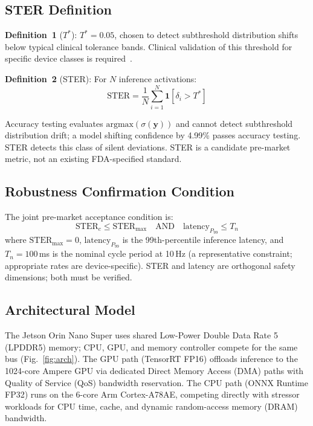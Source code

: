\documentclass[journal,twoside,9pt]{IEEEtran}
\begin{document}
\subsection{STER Definition}

\textbf{Definition~1} ($T^*$): $T^* = 0.05$, chosen to detect subthreshold
distribution shifts below typical clinical tolerance bands. Clinical validation
of this threshold for specific device classes is required~\cite{iso14971}.

\textbf{Definition~2} (STER): For $N$ inference activations:
\begin{equation}
  \text{STER} = \frac{1}{N}\sum_{i=1}^{N} \mathbf{1}[\delta_i > T^*]
  \label{eq:ster}
\end{equation}

Accuracy testing evaluates $\text{argmax}(\sigma(\mathbf{y}))$ and cannot detect
subthreshold distribution drift; a model shifting confidence by 4.99\% passes accuracy
testing. STER detects this class of silent deviations. STER is a candidate pre-market
metric, not an existing FDA-specified standard.

\subsection{Robustness Confirmation Condition}

The joint pre-market acceptance condition is:
\begin{equation}
  \text{STER}_c \leq \text{STER}_{\max}
  \quad\text{AND}\quad
  \text{latency}_{P_{99}} \leq T_n
  \label{eq:joint}
\end{equation}
where $\text{STER}_{\max}=0$, $\text{latency}_{P_{99}}$ is the 99th-percentile
inference latency, and $T_n=100$\,ms is the nominal cycle period at 10\,Hz (a
representative constraint; appropriate rates are device-specific). STER and latency
are orthogonal safety dimensions; both must be verified.

\subsection{Architectural Model}

The Jetson Orin Nano Super uses shared Low-Power Double Data Rate 5 (LPDDR5) memory;
CPU, GPU, and memory controller compete for the same bus (Fig.~\ref{fig:arch}). The
GPU path (TensorRT FP16) offloads inference to the 1024-core Ampere GPU via dedicated
Direct Memory Access (DMA) paths with Quality of Service (QoS) bandwidth reservation.
The CPU path (ONNX Runtime FP32) runs on the 6-core Arm Cortex-A78AE, competing
directly with stressor workloads for CPU time, cache, and dynamic random-access memory
(DRAM) bandwidth.
\end{document}
